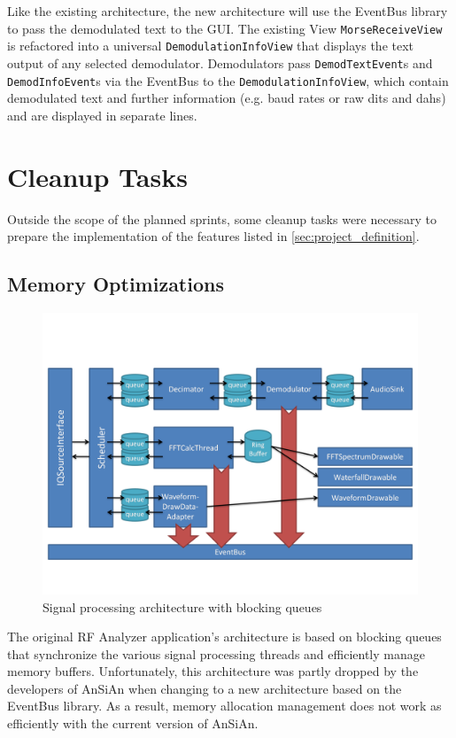 Like the existing architecture, the new architecture will use the EventBus
library to pass the demodulated text to the \ac{GUI}. The existing View
\texttt{MorseReceiveView} is refactored into a universal
\texttt{De\-mo\-du\-la\-tion\-In\-fo\-View} that displays the text output of any selected 
demodulator. Demodulators pass \texttt{DemodTextEvent}s and 
\texttt{DemodInfoEvent}s via the EventBus to the \texttt{De\-mo\-du\-la\-tion\-In\-fo\-View}, 
which contain demodulated text and further information (e.g. baud rates or raw 
dits and dahs) and are displayed in separate lines.

\section{Cleanup Tasks\label{sec:cleanup}}

Outside the scope of the planned sprints, some cleanup tasks were necessary
to prepare the implementation of the features listed in
\autoref{sec:project_definition}.

\subsection{Memory Optimizations\label{sec:cleanup.mem}}

\begin{figure}
	\centering
	\includegraphics[width=1\linewidth]{gfx/queue_arch}
	\caption{Signal processing architecture with blocking queues}
	\label{fig:queue_architecture}
\end{figure}

The original RF Analyzer application's architecture is based on
blocking queues that synchronize the various signal processing threads
and efficiently manage memory buffers. Unfortunately, this
architecture was partly dropped by the developers of AnSiAn when
changing to a new architecture based on the EventBus library. As a result, memory
allocation management does not work as efficiently with the current version
of AnSiAn.

